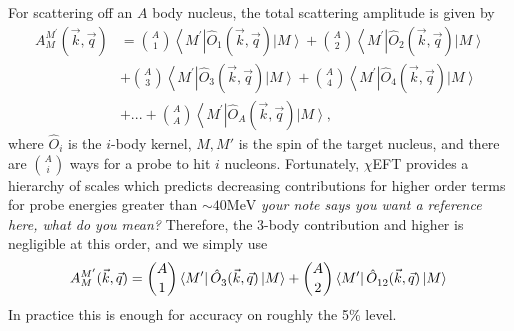 \documentclass[a4paper,11pt]{article}
\newcommand\bv[1]{\vec{#1}}
\newcommand{\ques}[1]{\color{red}\textit{ #1 }\color{black}}
\newcommand{\MeV}{\mathrm{MeV}}
\begin{document}
For scattering off an $A$ body nucleus, the total scattering
amplitude is given by
\begin{align}
  A_{M}^{M^{\prime} }(\bv{k}, \bv{q})&=\binom{A}{1}\left\langle
  M^{\prime}\right|\hat{O}_{1}^{}(\bv{k}, \bv{q})\left|M\right
  \rangle + \binom{A}{2} \left\langle
  M^{\prime}\right|\hat{O}_{2}^{}(\bv{k}, \bv{q}) \left|
  M\right\rangle\nonumber\\
  &+ \binom{A}{3}\left\langle
  M^{\prime}\right|\hat{O}_{3}^{}(\bv{k}, \bv{q})\left|M\right
  \rangle + \binom{A}{4} \left\langle
  M^{\prime}\right|\hat{O}_{4}^{}(\bv{k}, \bv{q}) \left| M\right\rangle\\
  &+... + \binom{A}{A}\left\langle
  M^{\prime}\right|\hat{O}_{A}^{}(\bv{k}, \bv{q})\left|M\right
  \rangle,\nonumber
\end{align}
where $\hat{O}_i$ is the $i$-body kernel, $M,M'$ is the spin of the target nucleus, and there are
$\binom{A}{i}$ ways for a probe to hit $i$ nucleons. Fortunately,
$\chi$EFT provides a hierarchy of scales which predicts decreasing
contributions for higher order terms for probe energies greater than $\sim 40 \MeV$
\ques{your note says you want a reference here, what do you mean?}
Therefore, the 3-body contribution and higher is negligible at this order, and we simply use
\begin{equation}
  A_{M}^{M^{\prime} }(\bv{k}, \bv{q})=\binom{A}{1}\left\langle
  M^{\prime}\right|\hat{O}_{3}^{}(\bv{k}, \bv{q})\left|M\right
  \rangle + \binom{A}{2} \left\langle
  M^{\prime}\right|\hat{O}_{12}^{}(\bv{k}, \bv{q}) \left|
  M\right\rangle\nonumber\\
\end{equation}
In practice this is enough for accuracy on roughly the 5\% level.
\end{document}
